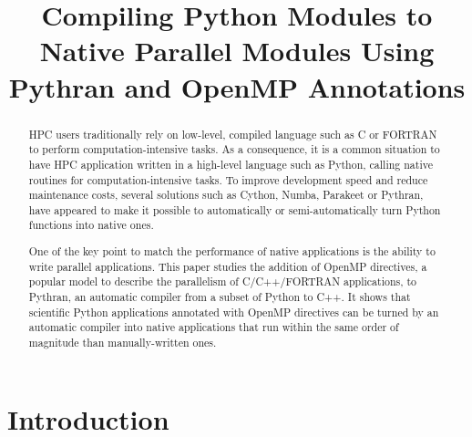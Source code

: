 \documentclass[conference]{IEEEtran}
\begin{document}
\renewcommand{\thelstlisting}{\arabic{lstlisting}}
%
\title{Compiling Python Modules to Native Parallel Modules Using Pythran and
OpenMP Annotations}

\author{
    \newline
}

\maketitle

%
\begin{abstract}

    HPC users traditionally rely on low-level, compiled language such as C or
    FORTRAN to perform computation-intensive tasks. As a consequence, it is a
    common situation to have HPC application written in a high-level language
    such as Python, calling native routines for computation-intensive tasks. To
    improve development speed and reduce maintenance costs, several solutions
    such as Cython, Numba, Parakeet or Pythran, have appeared to make it
    possible to automatically or semi-automatically turn Python functions into
    native ones.

    One of the key point to match the performance of native applications is the
    ability to write parallel applications. This paper studies the addition of
    OpenMP directives, a popular model to describe the parallelism of
    C/C++/FORTRAN applications, to Pythran, an automatic compiler from a subset
    of Python to C++. It shows that scientific Python applications annotated
    with OpenMP directives can be turned by an automatic compiler into native
    applications that run within the same order of magnitude than
    manually-written ones.

\end{abstract}

%
\section{Introduction}
\end{document}
